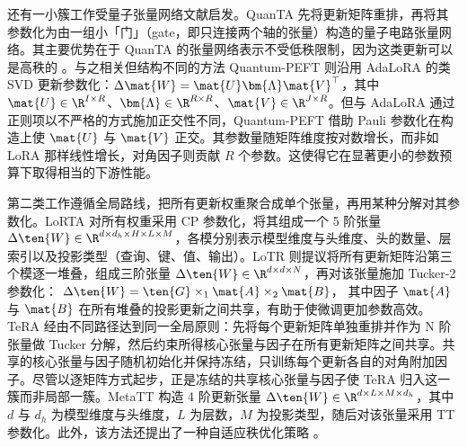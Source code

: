 还有一小簇工作受量子张量网络文献启发。QuanTA \cite{chen2024quanta} 先将更新矩阵重排，再将其参数化为由一组小「门」（gate，即只连接两个轴的张量）构造的量子电路张量网络。其主要优势在于 QuanTA 的张量网络表示不受低秩限制，因为这类更新可以是高秩的 \cite{chen2024quanta}。与之相关但结构不同的方法 Quantum-PEFT \cite{koikeakino2025quantumpeft} 则沿用 AdaLoRA \cite{zhang2023adalora} 的类 SVD 更新参数化：$\Delta \mat{W} = \mat{U} \bm{\Lambda} \mat{V}^\top$，其中 $\mat{U} \in \R^{I \times R}$、$\bm{\Lambda} \in \R^{R \times R}$、$\mat{V} \in \R^{J \times R}$。但与 AdaLoRA 通过正则项以不严格的方式施加正交性不同，Quantum-PEFT 借助 Pauli 参数化在构造上使 $\mat{U}$ 与 $\mat{V}$ 正交。其参数量随矩阵维度按对数增长，而非如 LoRA 那样线性增长，对角因子则贡献 $R$ 个参数。这使得它在显著更小的参数预算下取得相当的下游性能。


第二类工作遵循全局路线，把所有更新权重聚合成单个张量，再用某种分解对其参数化。LoRTA \cite{hounie2024lorta} 对所有权重采用 CP 参数化，将其组成一个 5 阶张量 $\Delta \ten{W} \in \R^{d\times d_h\times H\times L\times M}$，各模分别表示模型维度与头维度、头的数量、层索引以及投影类型（查询、键、值、输出）。LoTR \cite{bershatsky2024lotr} 则提议将所有更新矩阵沿第三个模逐一堆叠，组成三阶张量 $\Delta \ten{W} \in \R^{d \times d \times N}$，再对该张量施加 Tucker-2 参数化：
$\Delta \ten{W} = \ten{G} \times_1 \mat{A} \times_2 \mat{B}$，
其中因子 $\mat{A}$ 与 $\mat{B}$ 在所有堆叠的投影更新之间共享，有助于使微调更加参数高效。TeRA \cite{gu2026tera} 经由不同路径达到同一全局原则：先将每个更新矩阵单独重排并作为 N 阶张量做 Tucker 分解，然后约束所得核心张量与因子在所有更新矩阵之间共享。共享的核心张量与因子随机初始化并保持冻结，只训练每个更新各自的对角附加因子。尽管以逐矩阵方式起步，正是冻结的共享核心张量与因子使 TeRA 归入这一簇而非局部一簇。MetaTT \cite{lopezpiqueres2025metatt} 构造 4 阶更新张量 $\Delta \ten{W} \in \R^{d\times L\times M\times d_h}$，其中 $d$ 与 $d_h$ 为模型维度与头维度，$L$ 为层数，$M$ 为投影类型，随后对该张量采用 TT 参数化。此外，该方法还提出了一种自适应秩优化策略 \cite{lopezpiqueres2025metatt}。



